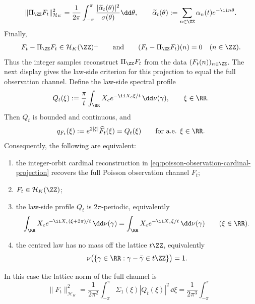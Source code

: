 \begin{theorem}
\begin{equation}
\|\Pi_{\ZZ}F_t\|_{\mathcal H_K}^2
=\frac1{2\pi}\int_{-\pi}^{\pi}
\frac{|\widetilde\alpha_t(\theta)|^2}{\sigma(\theta)}\dd\theta,
\qquad
\widetilde\alpha_t(\theta):=
\sum_{n\in\ZZ}\alpha_n(t)e^{-\ii n\theta}.
\end{equation}
Finally,
\[
F_t-\Pi_{\ZZ}F_t\in\mathcal H_K(\ZZ)^\perp
\qquad\text{and}\qquad
(F_t-\Pi_{\ZZ}F_t)(n)=0\quad(n\in\ZZ).
\]
Thus the integer samples reconstruct $\Pi_{\ZZ}F_t$ from the data
$(F_t(n))_{n\in\ZZ}$.  The next display gives the law-side criterion for this
projection to equal the full observation channel.
Define the law-side spectral profile
\begin{equation}\label{eq:poisson-law-side-profile}
Q_t(\xi)
:=\frac{\pi}{t}\int_{\RR}X_c
e^{-\ii X_c\xi/t}\,\dd\nu(\gamma),
\qquad \xi\in\RR .
\end{equation}
Then $Q_t$ is bounded and continuous, and
\begin{equation}\label{eq:poisson-law-side-q-profile}
q_{F_t}(\xi):=e^{2|\xi|}\widehat F_t(\xi)=Q_t(\xi)
\qquad\text{for a.e. }\xi\in\RR .
\end{equation}
Consequently, the following are equivalent:
\begin{enumerate}[label=(\roman*)]
\item the integer-orbit cardinal reconstruction in
      \eqref{eq:poisson-observation-cardinal-projection} recovers the full
      Poisson observation channel $F_t$;
\item $F_t\in\mathcal H_K(\ZZ)$;
\item the law-side profile $Q_t$ is $2\pi$-periodic, equivalently
      \begin{equation}\label{eq:poisson-law-side-periodicity}
      \int_{\RR}X_c e^{-\ii X_c(\xi+2\pi)/t}\,\dd\nu(\gamma)
      =
      \int_{\RR}X_c e^{-\ii X_c\xi/t}\,\dd\nu(\gamma)
      \qquad(\xi\in\RR).
      \end{equation}
\item the centred law has no mass off the lattice $t\ZZ$, equivalently
      \begin{equation}\label{eq:poisson-law-side-lattice-support}
      \nu\bigl(\{\gamma\in\RR:\gamma-\bar{\gamma}\in t\ZZ\}\bigr)=1 .
      \end{equation}
\end{enumerate}
In this case the lattice norm of the full channel is
\begin{equation}\label{eq:poisson-law-side-lattice-norm}
\|F_t\|_{\mathcal H_K}^2
=\frac{1}{2\pi^2}\int_{-\pi}^{\pi}
\Sigma_1(\xi)|Q_t(\xi)|^2\,\dd\xi
=\frac{1}{2\pi^3}\int_{-\pi}^{\pi}

\end{equation}
\end{theorem}
